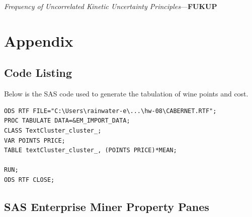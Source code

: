 \documentclass[12pt]{article}
\begin{document}
\textit{Frequency of Uncorrelated Kinetic Uncertainty Principles}---\textbf{FUKUP}

%


\section{Appendix}




\subsection{Code Listing}
Below is the SAS code used to generate the tabulation of wine points and cost.

{\tiny{}}
\begin{lstlisting}
ODS RTF FILE="C:\Users\rainwater-e\...\hw-08\CABERNET.RTF";
PROC TABULATE DATA=&EM_IMPORT_DATA;
CLASS TextCluster_cluster_;
VAR POINTS PRICE;
TABLE textCluster_cluster_, (POINTS PRICE)*MEAN;

RUN;
ODS RTF CLOSE;
\end{lstlisting}
\pagebreak


\subsection{SAS Enterprise Miner Property Panes}
\nopagebreak[4]
%
%
%
%
%
\end{document}
